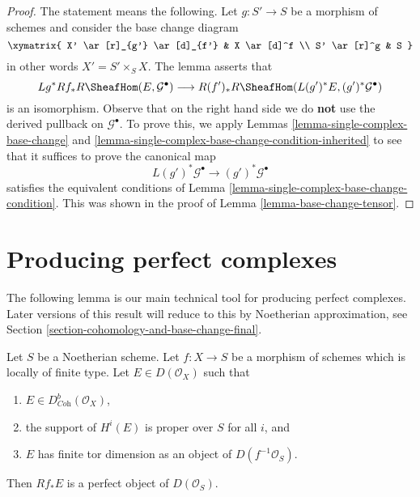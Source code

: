 \begin{proof}
The statement means the following. Let $g : S' \to S$ be a morphism of
schemes and consider the base change diagram
$$
\xymatrix{
X' \ar[r]_{g'} \ar[d]_{f'} &
X \ar[d]^f \\
S' \ar[r]^g &
S
}
$$
in other words $X' = S' \times_S X$. The lemma asserts that
$$
Lg^*Rf_*R\SheafHom(E, \mathcal{G}^\bullet)
\longrightarrow
R(f')_*R\SheafHom(L(g')^*E, (g')^*\mathcal{G}^\bullet)
$$
is an isomorphism. Observe that on the right hand side we do {\bf not}
use the derived pullback on $\mathcal{G}^\bullet$. To prove this, we apply
Lemmas \ref{lemma-single-complex-base-change} and
\ref{lemma-single-complex-base-change-condition-inherited} to see that it
suffices to prove the canonical map
$$
L(g')^*\mathcal{G}^\bullet \to (g')^*\mathcal{G}^\bullet
$$
satisfies the equivalent conditions of
Lemma \ref{lemma-single-complex-base-change-condition}.
This was shown in the proof of Lemma \ref{lemma-base-change-tensor}.
\end{proof}





\section{Producing perfect complexes}
\label{section-producing-perfect}

\noindent
The following lemma is our main technical tool for producing
perfect complexes. Later versions of this result will reduce to
this by Noetherian approximation, see
Section \ref{section-cohomology-and-base-change-final}.

\begin{lemma}
\label{lemma-perfect-direct-image}
Let $S$ be a Noetherian scheme. Let $f : X \to S$ be a morphism of schemes
which is locally of finite type. Let $E \in D(\mathcal{O}_X)$ such that
\begin{enumerate}
\item $E \in D^b_{\textit{Coh}}(\mathcal{O}_X)$,
\item the support of $H^i(E)$ is proper over $S$ for all $i$, and
\item $E$ has finite tor dimension as an object of $D(f^{-1}\mathcal{O}_S)$.
\end{enumerate}
Then $Rf_*E$ is a perfect object of $D(\mathcal{O}_S)$.
\end{lemma}

